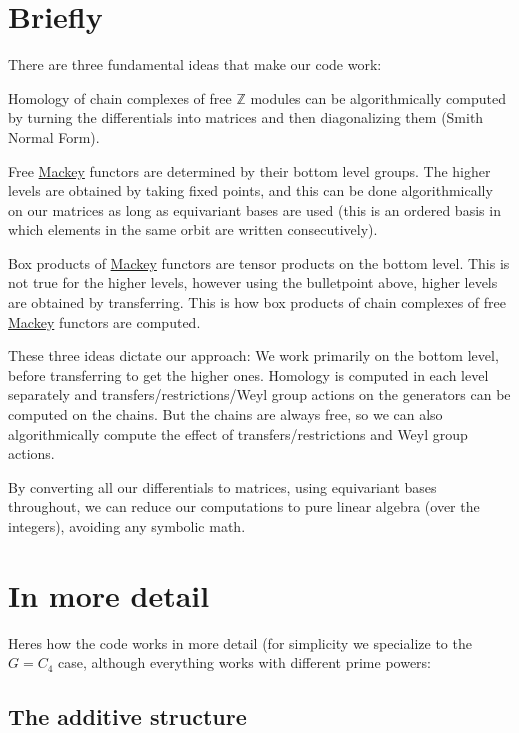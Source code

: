\hypertarget{math_Briefly}{}\section{Briefly}\label{math_Briefly}
There are three fundamental ideas that make our code work\+:


\begin{DoxyItemize}
\item Homology of chain complexes of free $\mathbb Z$ modules can be algorithmically computed by turning the differentials into matrices and then diagonalizing them (Smith Normal Form).
\item Free \hyperlink{namespaceMackey}{Mackey} functors are determined by their bottom level groups. The higher levels are obtained by taking fixed points, and this can be done algorithmically on our matrices as long as equivariant bases are used (this is an ordered basis in which elements in the same orbit are written consecutively).
\item Box products of \hyperlink{namespaceMackey}{Mackey} functors are tensor products on the bottom level. This is not true for the higher levels, however using the bulletpoint above, higher levels are obtained by transferring. This is how box products of chain complexes of free \hyperlink{namespaceMackey}{Mackey} functors are computed.
\end{DoxyItemize}

These three ideas dictate our approach\+: We work primarily on the bottom level, before transferring to get the higher ones. Homology is computed in each level separately and transfers/restrictions/\+Weyl group actions on the generators can be computed on the chains. But the chains are always free, so we can also algorithmically compute the effect of transfers/restrictions and Weyl group actions.

By converting all our differentials to matrices, using equivariant bases throughout, we can reduce our computations to pure linear algebra (over the integers), avoiding any symbolic math.\hypertarget{math_imd}{}\section{In more detail}\label{math_imd}
Here\textquotesingle{}s how the code works in more detail (for simplicity we specialize to the $G=C_4$ case, although everything works with different prime powers\+:\hypertarget{math_add}{}\subsection{The additive structure}\label{math_add}

